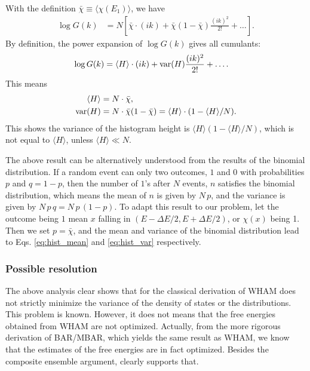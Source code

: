 \documentclass[aip,jcp,preprint,notitlepage, superscriptaddress]{revtex4-1}
\begin{document}
With the definition $\bar\chi \equiv \langle \chi( E_1 ) \rangle$,
we have
%
\begin{align*}
\log G(k)
&=
N
\left[
  \bar\chi \cdot (i k)
+
  \bar\chi
  \left(
    1 - \bar\chi
  \right)
  \frac{ (i k)^2 } { 2! }
+ \dots
\right]
.
\end{align*}
%
By definition,
the power expansion of $\log G(k)$
gives all cumulants\cite{vankampen}:
\begin{align*}
\log G(k)
&=
 \langle H \rangle \cdot (i k)
+
\mathrm{var}(H)
\frac{ (i k)^2 } { 2! }
+ \dots
.
\end{align*}
%
This means
%
\begin{align}
\langle H \rangle
&=
N \cdot \bar\chi,
\label{eq:hist_mean} \\
\mathrm{var}( H )
&=
N \cdot \bar\chi (1 - \bar\chi)
=
\langle H \rangle \cdot ( 1 - \langle H \rangle /N).
\label{eq:hist_var}
\end{align}
%
This shows the variance of
the histogram height
is $\langle H \rangle (1 - \langle H \rangle/N)$,
which is not equal to $\langle H \rangle$,
unless $\langle H \rangle \ll N$.



The above result can be alternatively
understood from the results of the binomial distribution.
%
If a random event can only two outcomes, $1$ and $0$
with probabilities $p$ and $q = 1 - p$,
then the number of $1$'s after $N$ events, $n$
satisfies the binomial distribution,
which means the mean of $n$ is given by $N \, p$,
and the variance is given by
$N \, p \, q = N \, p \, (1 - p)$.
%
To adapt this result to our problem,
let the outcome being $1$ mean
$x$ falling in $(E - \Delta E/2, E + \Delta E/2)$,
or $\chi(x)$ being 1.
%
Then we set $p = \bar \chi$,
and the mean and variance of the binomial distribution
lead to Eqs. \eqref{eq:hist_mean} and \eqref{eq:hist_var}
respectively.





\subsubsection{Possible resolution}



The above analysis clear shows
that for the classical derivation of WHAM
does not strictly minimize the variance of
the density of states or the distributions.
%
This problem is known\cite{chodera2007}.
%
However,
it does not means that
the free energies obtained from WHAM are not optimized.
%
Actually, from the more rigorous derivation of BAR/MBAR,
which yields the same result as WHAM,
we know that the estimates of the free energies
are in fact optimized.
%
Besides the composite ensemble argument,
clearly supports that.
\end{document}
